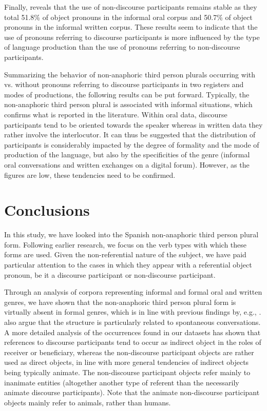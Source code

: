 \documentclass[output=paper]{langscibook}
\begin{document}
Finally,  reveals that the use of non-discourse participants remains stable as they total 51.8\% of object pronouns in the informal oral corpus and 50.7\% of object pronouns in the informal written corpus. These results seem to indicate that the use of pronouns referring to discourse participants is more influenced by the type of language production than the use of pronouns referring to non-discourse participants. 


Summarizing the behavior of non-anaphoric third person plurals occurring with vs. without pronouns referring to discourse participants in two registers and modes of productions, the following results can be put forward. Typically, the non-anaphoric third person plural is associated with informal situations, which confirms what is reported in the literature. Within oral data, discourse participants tend to be oriented towards the speaker whereas in written data they rather involve the interlocutor. It can thus be suggested that the distribution of participants is considerably impacted by the degree of formality and the mode of production of the language, but also by the specificities of the genre (informal oral conversations and written exchanges on a digital forum). However, as the figures are low, these tendencies need to be confirmed.  

\section{Conclusions}\label{sec:pierre:5}\largerpage

In this study, we have looked into the Spanish non-anaphoric third person plural form. Following earlier research, we focus on the verb types with which these forms are used. Given the non-referential nature of the subject, we have paid particular attention to the cases in which they appear with a referential object pronoun, be it a discourse participant or non-discourse participant. 

Through an analysis of corpora representing informal and formal oral and written genres, we have shown that the non-anaphoric third person plural form is virtually absent in formal genres, which is in line with previous findings by, e.g., \citet{DeCock2014, Pierre2021}. \citet[606]{SiewierskaPapastathi2011} also argue that the structure is particularly related to spontaneous conversations. A more detailed analysis of the occurrences found in our datasets has shown that references to discourse participants tend to occur as indirect object in the roles of receiver or beneficiary, whereas the non-discourse participant objects are rather used as direct objects, in line with more general tendencies of indirect objects being typically animate. The non-discourse participant objects refer mainly to inanimate entities (altogether another type of referent than the necessarily animate discourse participants). Note that the animate non-discourse participant objects  mainly refer to animals, rather than humans.
\end{document}
